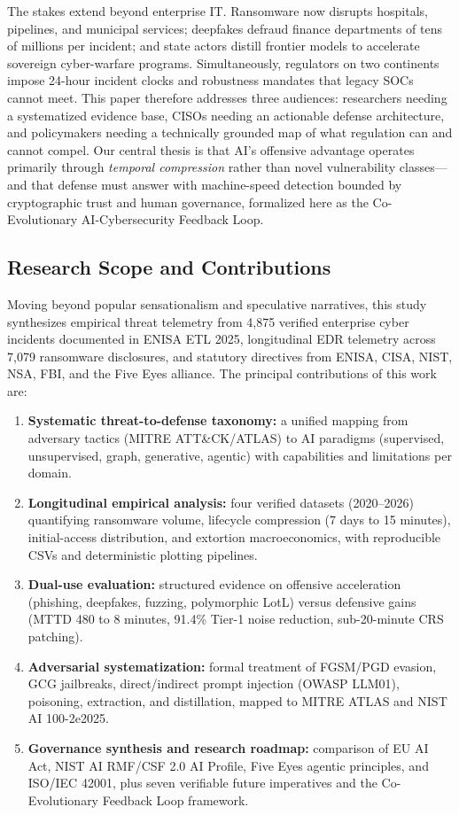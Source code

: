 \documentclass[conference,10pt,twocolumn,a4paper]{IEEEtran}
\begin{document}
The stakes extend beyond enterprise IT. Ransomware now disrupts hospitals, pipelines, and municipal services; deepfakes defraud finance departments of tens of millions per incident; and state actors distill frontier models to accelerate sovereign cyber-warfare programs. Simultaneously, regulators on two continents impose 24-hour incident clocks and robustness mandates that legacy SOCs cannot meet. This paper therefore addresses three audiences: researchers needing a systematized evidence base, CISOs needing an actionable defense architecture, and policymakers needing a technically grounded map of what regulation can and cannot compel. Our central thesis is that AI's offensive advantage operates primarily through \emph{temporal compression} rather than novel vulnerability classes---and that defense must answer with machine-speed detection bounded by cryptographic trust and human governance, formalized here as the Co-Evolutionary AI-Cybersecurity Feedback Loop.

\subsection{Research Scope and Contributions}
Moving beyond popular sensationalism and speculative narratives, this study synthesizes empirical threat telemetry from 4,875 verified enterprise cyber incidents documented in ENISA ETL 2025, longitudinal EDR telemetry across 7,079 ransomware disclosures, and statutory directives from ENISA, CISA, NIST, NSA, FBI, and the Five Eyes alliance. The principal contributions of this work are:
\begin{enumerate}
    \item \textbf{Systematic threat-to-defense taxonomy:} a unified mapping from adversary tactics (MITRE ATT\&CK/ATLAS) to AI paradigms (supervised, unsupervised, graph, generative, agentic) with capabilities and limitations per domain.
    \item \textbf{Longitudinal empirical analysis:} four verified datasets (2020--2026) quantifying ransomware volume, lifecycle compression (7 days to 15 minutes), initial-access distribution, and extortion macroeconomics, with reproducible CSVs and deterministic plotting pipelines.
    \item \textbf{Dual-use evaluation:} structured evidence on offensive acceleration (phishing, deepfakes, fuzzing, polymorphic LotL) versus defensive gains (MTTD 480 to 8 minutes, 91.4\% Tier-1 noise reduction, sub-20-minute CRS patching).
    \item \textbf{Adversarial systematization:} formal treatment of FGSM/PGD evasion, GCG jailbreaks, direct/indirect prompt injection (OWASP LLM01), poisoning, extraction, and distillation, mapped to MITRE ATLAS and NIST AI 100-2e2025.
    \item \textbf{Governance synthesis and research roadmap:} comparison of EU AI Act, NIST AI RMF/CSF 2.0 AI Profile, Five Eyes agentic principles, and ISO/IEC 42001, plus seven verifiable future imperatives and the Co-Evolutionary Feedback Loop framework.
\end{enumerate}
\end{document}

